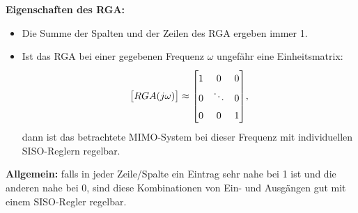 \textbf{Eigenschaften des RGA:} 
\begin{itemize}
    \item Die Summe der Spalten und der Zeilen des RGA ergeben immer 1.
    
    \item Ist das RGA bei einer gegebenen Frequenz $\omega$ ungefähr eine Einheitsmatrix:
    \begin{equation*}
        \big[RGA(\jw)\big]\approx 
        {\renewcommand{\arraystretch}{1.5}
        \begin{bmatrix}
            1&0&0\\
            0&\ddots&0\\
            0&0&1
        \end{bmatrix}
        },
    \end{equation*}
    dann ist das betrachtete MIMO-System bei dieser Frequenz mit individuellen SISO-Reglern regelbar.
\end{itemize}
\textbf{Allgemein:} falls in jeder Zeile/Spalte ein Eintrag sehr nahe bei 1 ist und die anderen nahe bei 0, sind diese Kombinationen von Ein- und Ausgängen gut mit einem SISO-Regler regelbar.

